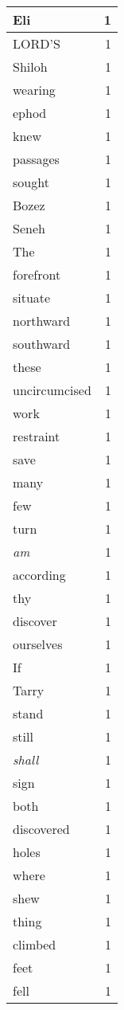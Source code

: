 \begin{center}
\begin{longtable}{l|r}
Eli & 1 \\ \hline
LORD'S & 1 \\ \hline
Shiloh & 1 \\ \hline
wearing & 1 \\ \hline
ephod & 1 \\ \hline
knew & 1 \\ \hline
passages & 1 \\ \hline
sought & 1 \\ \hline
Bozez & 1 \\ \hline
Seneh & 1 \\ \hline
The & 1 \\ \hline
forefront & 1 \\ \hline
situate & 1 \\ \hline
northward & 1 \\ \hline
southward & 1 \\ \hline
these & 1 \\ \hline
uncircumcised & 1 \\ \hline
work & 1 \\ \hline
restraint & 1 \\ \hline
save & 1 \\ \hline
many & 1 \\ \hline
few & 1 \\ \hline
turn & 1 \\ \hline
\emph{am} & 1 \\ \hline
according & 1 \\ \hline
thy & 1 \\ \hline
discover & 1 \\ \hline
ourselves & 1 \\ \hline
If & 1 \\ \hline
Tarry & 1 \\ \hline
stand & 1 \\ \hline
still & 1 \\ \hline
\emph{shall} & 1 \\ \hline
sign & 1 \\ \hline
both & 1 \\ \hline
discovered & 1 \\ \hline
holes & 1 \\ \hline
where & 1 \\ \hline
shew & 1 \\ \hline
thing & 1 \\ \hline
climbed & 1 \\ \hline
feet & 1 \\ \hline
fell & 1 \\ \hline

\end{longtable}
\end{center}

